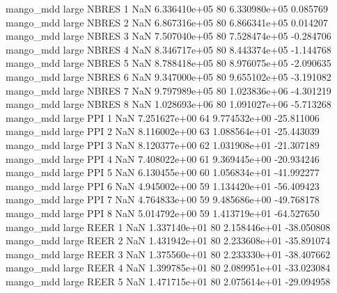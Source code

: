         mango_mdd      large    NBRES                 1                  NaN 6.336410e+05 80   6.330980e+05           0.085769
        mango_mdd      large    NBRES                 2                  NaN 6.867316e+05 80   6.866341e+05           0.014207
        mango_mdd      large    NBRES                 3                  NaN 7.507040e+05 80   7.528474e+05          -0.284706
        mango_mdd      large    NBRES                 4                  NaN 8.346717e+05 80   8.443374e+05          -1.144768
        mango_mdd      large    NBRES                 5                  NaN 8.788418e+05 80   8.976075e+05          -2.090635
        mango_mdd      large    NBRES                 6                  NaN 9.347000e+05 80   9.655102e+05          -3.191082
        mango_mdd      large    NBRES                 7                  NaN 9.797989e+05 80   1.023836e+06          -4.301219
        mango_mdd      large    NBRES                 8                  NaN 1.028693e+06 80   1.091027e+06          -5.713268
        mango_mdd      large      PPI                 1                  NaN 7.251627e+00 64   9.774532e+00         -25.811006
        mango_mdd      large      PPI                 2                  NaN 8.116002e+00 63   1.088564e+01         -25.443039
        mango_mdd      large      PPI                 3                  NaN 8.120377e+00 62   1.031908e+01         -21.307189
        mango_mdd      large      PPI                 4                  NaN 7.408022e+00 61   9.369445e+00         -20.934246
        mango_mdd      large      PPI                 5                  NaN 6.130455e+00 60   1.056834e+01         -41.992277
        mango_mdd      large      PPI                 6                  NaN 4.945002e+00 59   1.134420e+01         -56.409423
        mango_mdd      large      PPI                 7                  NaN 4.764833e+00 59   9.485686e+00         -49.768178
        mango_mdd      large      PPI                 8                  NaN 5.014792e+00 59   1.413719e+01         -64.527650
        mango_mdd      large     REER                 1                  NaN 1.337140e+01 80   2.158446e+01         -38.050808
        mango_mdd      large     REER                 2                  NaN 1.431942e+01 80   2.233608e+01         -35.891074
        mango_mdd      large     REER                 3                  NaN 1.375560e+01 80   2.233330e+01         -38.407662
        mango_mdd      large     REER                 4                  NaN 1.399785e+01 80   2.089951e+01         -33.023084
        mango_mdd      large     REER                 5                  NaN 1.471715e+01 80   2.075614e+01         -29.094958
